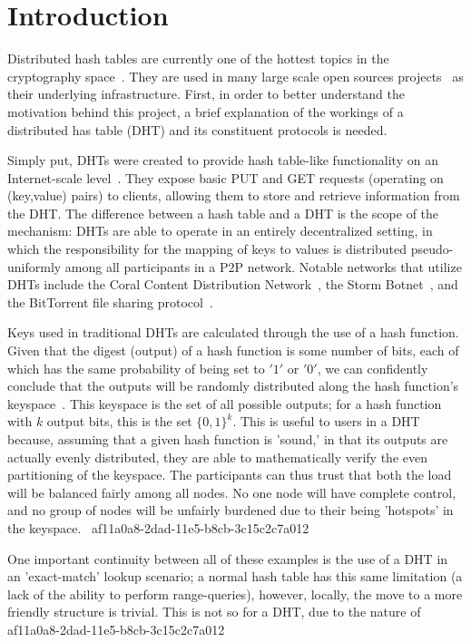 \documentclass[12pt]{article}
\begin{document}
\section{Introduction}
\par Distributed hash tables are currently one of the hottest topics in the cryptography space~\cite{Stoica:2001dj,Rowstron:2001ea,Ratnasamy:2001wn}. They are used in many large scale open sources projects~\cite{Freitas:2013tb,Xu:2010vs,Perfitt:2010fh} as their underlying infrastructure. First, in order to better understand the motivation behind this project, a brief explanation of the workings of a distributed has table (DHT) and its constituent protocols is needed.

\par Simply put, DHTs were created to provide hash table-like functionality on an Internet-scale level~\cite{Ratnasamy:2001wn}. They expose basic PUT and GET requests (operating on (key,value) pairs) to clients, allowing them to store and retrieve information from the DHT. The difference between a hash table and a DHT is the scope of the mechanism: DHTs are able to operate in an entirely decentralized setting, in which the responsibility for the mapping of keys to values is distributed pseudo-uniformly among all participants in a P2P network. Notable networks that utilize DHTs include the Coral Content Distribution Network~\cite{Freedman:2004vb}, the Storm Botnet~\cite{Holz:2008uk}, and the BitTorrent file sharing protocol~\cite{Cohen:y1_8mBnw}.

\par Keys used in traditional DHTs are calculated through the use of a hash function. Given that the digest (output) of a hash function is some number of bits, each of which has the same probability of being set to $'1'$ or $'0'$, we can confidently conclude that the outputs will be randomly distributed along the hash function's keyspace~. This keyspace is the set of all possible outputs; for a hash function with $k$ output bits, this is the set $\{0,1\}^k$. This is useful to users in a DHT because, assuming that a given hash function is 'sound,' in that its outputs are actually evenly distributed, they are able to mathematically verify the even partitioning of the keyspace. The participants can thus trust that both the load will be balanced fairly among all nodes. No one node will have complete control, and no group of nodes will be unfairly burdened due to their being 'hotspots' in the keyspace.~
af11a0a8-2dad-11e5-b8cb-3c15c2c7a012
\par One important continuity between all of these examples is the use of a DHT in an 'exact-match' lookup scenario; a normal hash table has this same limitation (a lack of the ability to perform range-queries), however, locally, the move to a more friendly structure is trivial. This is not so for a DHT, due to the nature of
af11a0a8-2dad-11e5-b8cb-3c15c2c7a012\printbibliography
\end{document}
